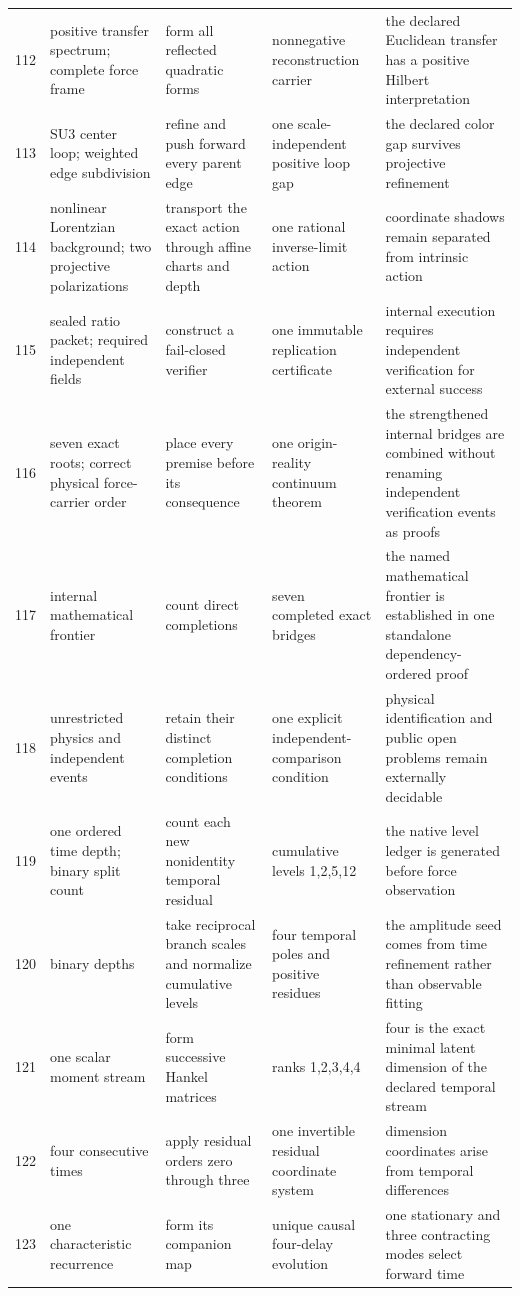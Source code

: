\documentclass[11pt]{article}
\numberwithin{equation}{section}
\theoremstyle{remark}
\begin{document}
\begin{landscape}
\begin{longtable}{p{0.65cm}p{3.5cm}p{4.0cm}p{4.0cm}p{4.6cm}}
112&positive transfer spectrum; complete force frame&form all reflected quadratic forms&nonnegative reconstruction carrier&the declared Euclidean transfer has a positive Hilbert interpretation\\
113&SU3 center loop; weighted edge subdivision&refine and push forward every parent edge&one scale-independent positive loop gap&the declared color gap survives projective refinement\\
114&nonlinear Lorentzian background; two projective polarizations&transport the exact action through affine charts and depth&one rational inverse-limit action&coordinate shadows remain separated from intrinsic action\\
115&sealed ratio packet; required independent fields&construct a fail-closed verifier&one immutable replication certificate&internal execution requires independent verification for external success\\
116&seven exact roots; correct physical force-carrier order&place every premise before its consequence&one origin-reality continuum theorem&the strengthened internal bridges are combined without renaming independent verification events as proofs\\
117&internal mathematical frontier&count direct completions&seven completed exact bridges&the named mathematical frontier is established in one standalone dependency-ordered proof\\
118&unrestricted physics and independent events&retain their distinct completion conditions&one explicit independent-comparison condition&physical identification and public open problems remain externally decidable\\
119&one ordered time depth; binary split count&count each new nonidentity temporal residual&cumulative levels 1,2,5,12&the native level ledger is generated before force observation\\
120&binary depths&take reciprocal branch scales and normalize cumulative levels&four temporal poles and positive residues&the amplitude seed comes from time refinement rather than observable fitting\\
121&one scalar moment stream&form successive Hankel matrices&ranks 1,2,3,4,4&four is the exact minimal latent dimension of the declared temporal stream\\
122&four consecutive times&apply residual orders zero through three&one invertible residual coordinate system&dimension coordinates arise from temporal differences\\
123&one characteristic recurrence&form its companion map&unique causal four-delay evolution&one stationary and three contracting modes select forward time\\

\end{longtable}
\end{landscape}
\end{document}
